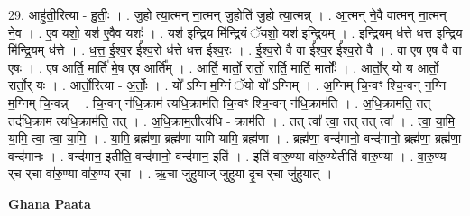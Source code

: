 \documentclass[17pt]{extarticle}
\begin{document}
29. आहु॑ती॒रित्या - हु॒तीः॒ । . जु॒हो त्या॒त्मन् ना॒त्मन् जु॒होति॑ जु॒हो त्या॒त्मन्न् । . आ॒त्मन् ने॒वै वात्मन् ना॒त्मन् ने॒व । . ए॒व यशो॒ यश॑ ए॒वैव यशः॑ । . यश॑ इन्द्रि॒य मि॑न्द्रि॒यं ॅयशो॒ यश॑ इन्द्रि॒यम् । . इ॒न्द्रि॒यम् ध॑त्ते धत्त इन्द्रि॒य मि॑न्द्रि॒यम् ध॑त्ते । . ध॒त्त॒ ई॒श्व॒र ई᳚श्व॒रो ध॑त्ते धत्त ईश्व॒रः । . ई॒श्व॒रो वै वा ई᳚श्व॒र ई᳚श्व॒रो वै । . वा ए॒ष ए॒ष वै वा ए॒षः । . ए॒ष आर्ति॒ मार्ति॑ मे॒ष ए॒ष आर्ति᳚म् । . आर्ति॒ मार्तो॒ रार्तो॒ रार्ति॒ मार्ति॒ मार्तोः᳚ । . आर्तो॒र् यो य आर्तो॒ रार्तो॒र् यः । . आर्तो॒रित्या - अ॒र्तोः॒ । . यो᳚ ऽग्नि म॒ग्निं ॅयो यो᳚ ऽग्निम् । . अ॒ग्निम् चि॒न्वꣳ श्चि॒न्वन् न॒ग्नि म॒ग्निम् चि॒न्वन्न् । . चि॒न्वन् न॑धि॒क्राम॑ त्यधि॒क्राम॑ति चि॒न्वꣳ श्चि॒न्वन् न॑धि॒क्राम॑ति । . अ॒धि॒क्राम॑ति॒ तत् तद॑धि॒क्राम॑ त्यधि॒क्राम॑ति॒ तत् । . अ॒धि॒क्राम॒तीत्य॑धि - क्राम॑ति । . तत् त्वा᳚ त्वा॒ तत् तत् त्वा᳚ । . त्वा॒ या॒मि॒ या॒मि॒ त्वा॒ त्वा॒ या॒मि॒ । . या॒मि॒ ब्रह्म॑णा॒ ब्रह्म॑णा यामि यामि॒ ब्रह्म॑णा । . ब्रह्म॑णा॒ वन्द॑मानो॒ वन्द॑मानो॒ ब्रह्म॑णा॒ ब्रह्म॑णा॒ वन्द॑मानः । . वन्द॑मान॒ इतीति॒ वन्द॑मानो॒ वन्द॑मान॒ इति॑ । . इति॑ वारु॒ण्या वा॑रु॒ण्येतीति॑ वारु॒ण्या । . वा॒रु॒ण्य र्‌च र्‌चा वा॑रु॒ण्या वा॑रु॒ण्य र्‌चा । . ऋ॒चा जु॑हुयाज् जुहुया दृ॒च र्‌चा जु॑हुयात् । \newline

\textbf{Ghana Paata } \newline
\end{document}
